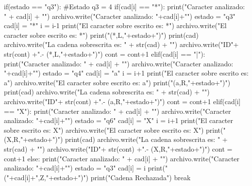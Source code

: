 \documentclass{article}
\begin{document}
\begin{python}
					if(estado == "q3"): #Estado q3 = 4
						if(cad[i] == "*"):
							print("Caracter analizado: " + cad[i] + "\n")
							archivo.write("Caracter analizado: "+cad[i]+"\n")
							estado = "q3"
							cad[i] = "*"
							i = i-1
							print("El caracter sobre escrito es: *\n")
							archivo.write("El caracter sobre escrito es: *\n")
							print("(*,L,"+estado+")\n")
							print(cad)
							archivo.write("La cadena sobrescrita es: " + str(cad) + "\n")
							archivo.write("ID"+ str(cont) +".- (*,L,"+estado+")\n\n")
							cont = cont+1
						elif(cad[i] == "|"):
							print("Caracter analizado: " + cad[i] + "\n")
							archivo.write("Caracter analizado: "+cad[i]+"\n")
							estado = "q4"
							cad[i] = "a"
							i = i+1
							print("El caracter sobre escrito es: a\n")
							archivo.write("El caracter sobre escrito es: a\n")
							print("(a,R,"+estado+")\n")
							print(cad)
							archivo.write("La cadena sobrescrita es: " + str(cad) + "\n")
							archivo.write("ID"+ str(cont) +".- (a,R,"+estado+")\n\n")
							cont = cont+1
						elif(cad[i] == "X"):
							print("Caracter analizado: " + cad[i] + "\n")
							archivo.write("Caracter analizado: "+cad[i]+"\n")
							estado = "q6"
							cad[i] = "X"
							i = i+1
							print("El caracter sobre escrito es: X\n")
							archivo.write("El caracter sobre escrito es: X\n")
							print("(X,R,"+estado+")\n")
							print(cad)
							archivo.write("La cadena sobrescrita es: " + str(cad) + "\n")
							archivo.write("ID"+ str(cont) +".- (X,R,"+estado+")\n\n")
							cont = cont+1
						else:
							print("Caracter analizado: " + cad[i] + "\n")
							archivo.write("Caracter analizado: "+cad[i]+"\n")
							estado = "q3"
							cad[i] = i
							print("("+cad[i]+",Z,"+estado+")\n")
							print("Cadena Rechazada")
							break 
				

\end{python}
\end{document}
